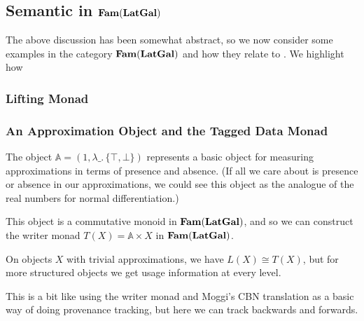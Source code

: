 

\subsection{Semantic \GPS in $\mathbf{Fam}(\mathbf{LatGal})$}
\label{sec:semantic-gps}

The above discussion has been somewhat abstract, so we now consider
some examples in the category $\mathbf{Fam}(\mathbf{LatGal})$ and how they relate to
\GPS. We highlight how

\subsubsection{Lifting Monad}


\subsubsection{An Approximation Object and the Tagged Data Monad}


The object $\mathbb{A} = (1, \lambda \_.\, \{\top,\bot\})$ represents
a basic object for measuring approximations in terms of presence and
absence. (If all we care about is presence or absence in our
approximations, we could see this object as the analogue of the real
numbers for normal differentiation.)

This object is a commutative monoid in $\mathbf{Fam}(\mathbf{LatGal})$, and so we can
construct the writer monad $T(X) = \mathbb{A} \times X$ in
$\mathbf{Fam}(\mathbf{LatGal})$.

On objects $X$ with trivial approximations, we have $L(X) \cong T(X)$,
but for more structured objects we get usage information at every level.

This is a bit like using the writer monad and Moggi's CBN translation
as a basic way of doing provenance tracking, but here we can track
backwards and forwards.

